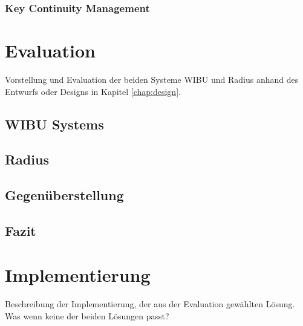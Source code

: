 \documentclass[11pt,a4paper]{report}
\begin{document}
\subsection{Key Continuity Management}

\chapter{Evaluation} \label{chap:evaluation}

Vorstellung und Evaluation der beiden Systeme WIBU und Radius anhand des Entwurfs oder Designs in Kapitel \ref{chap:design}.

\section{WIBU Systems}

\section{Radius}

\section{Gegenüberstellung}

\section{Fazit}

\chapter{Implementierung} \label{chap:implementation}

Beschreibung der Implementierung, der aus der Evaluation gewählten Lösung. Was wenn keine der beiden Lösungen passt?
\end{document}
